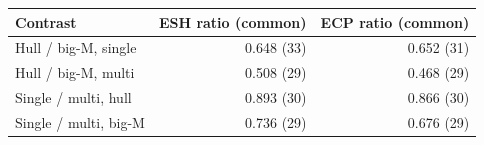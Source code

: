 \begin{tabular}{lrr}
\toprule
Contrast & ESH ratio (common) & ECP ratio (common) \\
\midrule
Hull / big-M, single & 0.648 (33) & 0.652 (31) \\
Hull / big-M, multi & 0.508 (29) & 0.468 (29) \\
Single / multi, hull & 0.893 (30) & 0.866 (30) \\
Single / multi, big-M & 0.736 (29) & 0.676 (29) \\
\bottomrule
\end{tabular}
